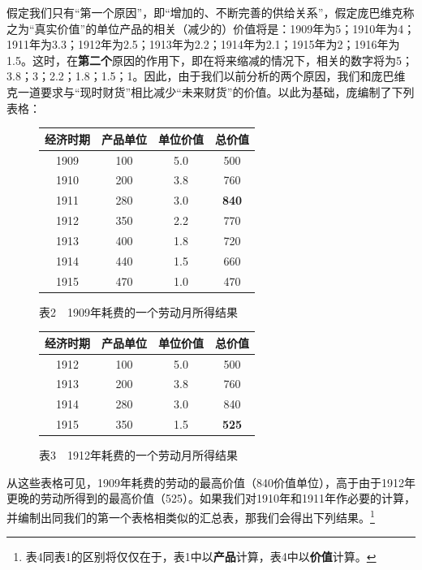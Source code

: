 \documentclass[fontset=fandol, a4paper, 12pt, openright]{ctexbook}
\begin{document}
假定我们只有“第一个原因”，即“增加的、不断完善的供给关系”，假定庞巴维克称之为“真实价值”的单位产品的相关（减少的）价值将是：1909年为5；1910年为4；1911年为3.3；1912年为2.5；1913年为2.2；1914年为2.1；1915年为2；1916年为1.5。这时，在\textbf{第二个}原因的作用下，即在将来缩减的情况下，相关的数字将为5；3.8；3；2.2；1.8；1.5；1。因此，由于我们以前分析的两个原因，我们和庞巴维克一道要求与“现时财货”相比减少“未来财货”的价值。以此为基础，庞编制了下列表格：

\begin{figure}[htbp]
    \centering
    \begin{tabular}{c c c c}
        \hline
        经济时期 & 产品单位 & 单位价值 & 总价值 \\
        \hline
        1909 & 100 & 5.0 & 500 \\
        1910 & 200 & 3.8 & 760 \\
        1911 & 280 & 3.0 & \textbf{840} \\
        1912 & 350 & 2.2 & 770 \\
        1913 & 400 & 1.8 & 720 \\
        1914 & 440 & 1.5 & 660 \\
        1915 & 470 & 1.0 & 470 \\
        \hline
    \end{tabular}
    \caption{表2　1909年耗费的一个劳动月所得结果}
\end{figure}

\begin{figure}[htbp]
    \centering
    \begin{tabular}{c c c c}
        \hline
        经济时期 & 产品单位 & 单位价值 & 总价值 \\
        \hline
        1912 & 100 & 5.0 & 500 \\
        1913 & 200 & 3.8 & 760 \\
        1914 & 280 & 3.0 & 840 \\
        1915 & 350 & 1.5 & \textbf{525} \\
        \hline
    \end{tabular}
    \caption{表3　1912年耗费的一个劳动月所得结果}
\end{figure}

从这些表格可见，1909年耗费的劳动的最高价值（840价值单位），高于由于1912年更晚的劳动所得到的最高价值（525）。如果我们对1910年和1911年作必要的计算，并编制出同我们的第一个表格相类似的汇总表，那我们会得出下列结果。\footnote{表4同表1的区别将仅仅在于，表1中以\textbf{产品}计算，表4中以\textbf{价值}计算。}
\end{document}
